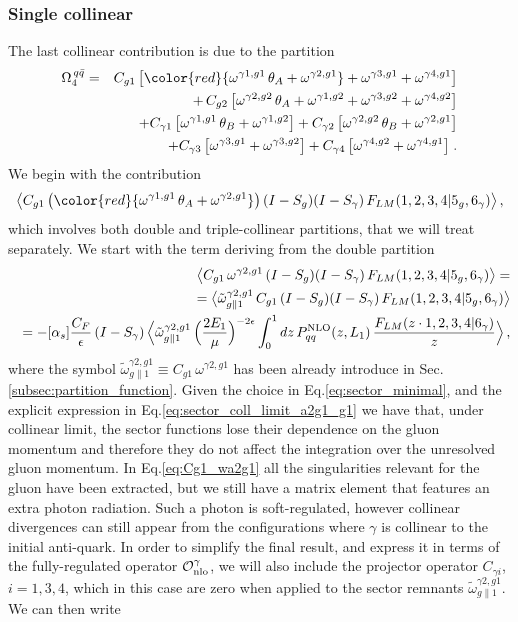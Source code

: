 \documentclass[12pt,a4paper]{article}
\newcommand{\nn}{\nonumber}
\newcommand{\eps}{\epsilon}
\newcommand{\beq}{\begin{eqnarray}}
\newcommand{\eeq}{\end{eqnarray}}
\begin{document}
\subsubsection{Single collinear}
The last collinear contribution is due to the partition
\beq
\Omega^{\, q\bar{q}}_4 &=& 
C_{g1} \, 
\big[
{\color{red}{ \omega^{\gamma1,g1}  \, \theta_A 
+  \omega^{\gamma2,g1} 
}}
+  \omega^{\gamma3,g1} 
+  \omega^{\gamma4,g1} \big]
\nn \\
&&
+ \, C_{g2} \, 
\big[ \omega^{\gamma2,g2}  \, \theta_A 
+  \omega^{\gamma1,g2}
+  \omega^{\gamma3,g2}
+  \omega^{\gamma4,g2}
 \big]
\nn \\
&& 
+ C_{\gamma1} \, 
\big[ \omega^{\gamma1,g1}  \, \theta_B 
+  \omega^{\gamma1,g2} \big]
+ C_{\gamma2} \, 
\big[ \omega^{\gamma2,g2}  \, \theta_B +  \omega^{\gamma2,g1} \big] 
\nn \\
&&
+ C_{\gamma3} \, 
\big[ \omega^{\gamma3,g1} 
+  \omega^{\gamma3,g2} \big]
+ C_{\gamma4} \, 
\big[ \omega^{\gamma4,g2} 
+  \omega^{\gamma4,g1} \big] 
\; .
\eeq
We begin with the contribution
\beq
\big\langle C_{g1} \, 
\big(
{\color{red}{
 \omega^{\gamma1,g1}  \, \theta_A 
+  \omega^{\gamma2,g1}
}}
 \big) \, 
(I-S_g) (I-S_\gamma)   \, 
F_{LM}(1,2,3,4|5_g,6_\gamma)
\big\rangle \, ,
\eeq
which involves both double and triple-collinear partitions, that we will treat separately. 
We start with the term deriving from the double partition
\beq
&&
\big\langle C_{g1} \, 
 \omega^{\gamma2,g1} \, 
(I-S_g) (I-S_\gamma)   \, 
F_{LM}(1,2,3,4|5_g,6_\gamma)
\big\rangle
=
\nn \\
&&
=
\big\langle 
 \tilde{\omega}^{\gamma2,g1}_{g \parallel 1} \, 
 C_{g1} \, 
(I-S_g) (I-S_\gamma)   \, 
F_{LM}(1,2,3,4|5_g,6_\gamma)
\big\rangle
 \label{eq:Cg1_wa2g1} \\ \nn
&&
=
-[\alpha_s] \frac{C_F}\eps \, 
(I-S_\gamma)   \, 
\Big\langle
\tilde{\omega}^{\gamma2,g1}_{g \parallel 1} \, 
\Big(\frac{2 E_1}{\mu}\Big)^{-2\eps}
\int_0^1 dz \, P_{qq}^{\rm NLO}(z,L_1) \, 
\frac{F_{LM}(z\cdot 1, 2, 3, 4| 6_\gamma)}{z}
\Big\rangle \, , 
\eeq
where the symbol $\tilde{\omega}^{\gamma2,g1}_{g \parallel 1}
\equiv C_{g1} \,  \omega^{\gamma2,g1} $ has been already introduce in Sec.\ref{subsec:partition_function}. Given the choice in Eq.\eqref{eq:sector_minimal}, and the explicit expression in Eq.\eqref{eq:sector_coll_limit_a2g1_g1} we have that, under collinear limit, the sector functions lose their dependence on the gluon momentum and therefore they do not affect the integration over the unresolved gluon momentum. In Eq.\eqref{eq:Cg1_wa2g1} all the singularities relevant for the gluon have been extracted, but we still have a matrix element that features an extra photon radiation. Such a photon is soft-regulated, however collinear divergences can still appear from the configurations where $\gamma$ is collinear to the initial anti-quark. In order to simplify the final result, and express it in terms of the fully-regulated operator $\mathcal{O}_{\rm nlo}^\gamma$, we will also include the projector operator $C_{\gamma i}$, $i=1,3,4$, which in this case are zero when applied to the sector remnants $\tilde{\omega}^{\gamma2,g1}_{g \parallel 1}$. We can then write
\end{document}
